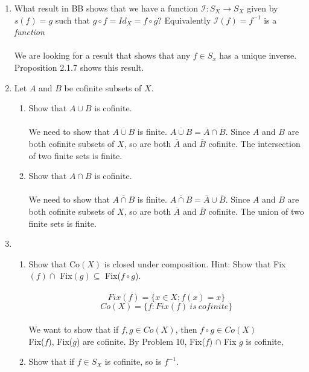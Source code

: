 \documentclass[11pt]{article}
\begin{document}
\begin{enumerate}
\newpage
\item What result in BB shows that we have a function $\mathcal{I} : S_X \to S_X$ given by $s(f) = g$ such that $g \circ f = Id_X = f \circ g$? Equivalently $\mathcal{I}(f) = f^{-1}$ is a \emph{function}\\\\
We are looking for a result that shows that any $f \in S_x$ has a unique inverse.  Proposition 2.1.7 shows this result.

\newpage
\item Let $A$ and $B$ be cofinite subsets of $X$.\\
\begin{enumerate}
\item Show that $A \cup B$ is cofinite.\\\\
We need to show that $\overline{A \cup B}$ is finite.  $\overline{A \cup B} = \overline{A} \cap \overline{B}$. Since $A$ and $B$ are both cofinite subsets of $X$, so are both $\overline{A}$ and $\overline{B}$ cofinite.  The intersection of two finite sets is finite.
\item Show that $A \cap B$ is cofinite.\\\\
We need to show that $\overline{A \cap B}$ is finite.  $\overline{A \cap B} = \overline{A} \cup \overline{B}$. Since $A$ and $B$ are both cofinite subsets of $X$, so are both $\overline{A}$ and $\overline{B}$ cofinite.  The union of two finite sets is finite.
\end{enumerate}

\newpage
\item
\begin{enumerate}
\item Show that Co$(X)$ is closed under composition.  Hint: Show that Fix$(f) \cap$ Fix$(g) \subseteq$ Fix($f \circ g$).\\
\\
$$Fix(f) = \{x\in X; f(x) = x\}$$
$$Co(X) = \{f : Fix(f)\ is\ cofinite\}$$
\\
We want to show that if $f,g \in Co(X)$, then $f \circ g \in Co(X)$\\
Fix($f$), Fix($g$) are cofinite.  By Problem 10, Fix($f$) $\cap$ Fix $g$ is cofinite, 
\\
\item Show that if $f \in S_X$ is cofinite, so is $f^{-1}$.
\end{enumerate}


\end{enumerate}
\end{document}
